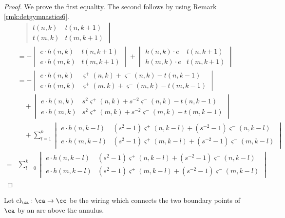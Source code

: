 \begin{proof}
We prove the first equality. The second follows by using Remark \ref{rmk:detgymnastics6}.
\begin{align*}
&\quad \begin{vmatrix}
t(n, k) & t(n, k+1) \\
t(m, k) & t(m, k+1)
\end{vmatrix} \\
&= - 
\begin{vmatrix}
e \cdot h(n, k) & t(n, k+1) \\
e \cdot h(m, k) & t(m, k+1)
\end{vmatrix} 
+
\begin{vmatrix}
h(n, k) \cdot e & t(n, k+1) \\
h(m, k) \cdot e & t(m, k+1)
\end{vmatrix}
\\
&= - 
\begin{vmatrix}
e \cdot h(n, k) & \varsigma^+ (n, k) + \varsigma^- (n, k) - t(n, k-1) \\
e \cdot h(m, k) & \varsigma^+ (m, k) + \varsigma^- (m, k) - t(m, k-1)
\end{vmatrix} \\
&\quad +
\begin{vmatrix}
e \cdot h(n, k) & s^2 \varsigma^+ (n, k) + s^{-2} \varsigma^- (n, k) - t(n, k-1) \\
e \cdot h(m, k) & s^2 \varsigma^+ (m, k) + s^{-2} \varsigma^- (m, k) - t(m, k-1)
\end{vmatrix}\\
&\quad +
\sum_{l=1}^{k}
\begin{vmatrix}
e \cdot h(n, k-l) & (s^2 - 1) \varsigma^+ (n, k-l) + (s^{-2} - 1) \varsigma^- (n, k-l) \\
e \cdot h(m, k-l) & (s^2 - 1) \varsigma^+ (m, k-l) + (s^{-2} - 1) \varsigma^- (m, k-l)
\end{vmatrix} \\
= & \sum_{l=0}^{k}
\begin{vmatrix}
e \cdot h(n, k-l) & (s^2 - 1) \varsigma^+ (n, k-l) + (s^{-2} - 1) \varsigma^- (n, k-l) \\
e \cdot h(m, k-l) & (s^2 - 1) \varsigma^+ (m, k-l) + (s^{-2} - 1) \varsigma^- (m, k-l)
\end{vmatrix} 
\end{align*}
\end{proof}

Let $\textrm{cl}_\ca : \ca \to \cc$ be the wiring which connects the two boundary points of $\ca$ by an arc above the annulus. 

